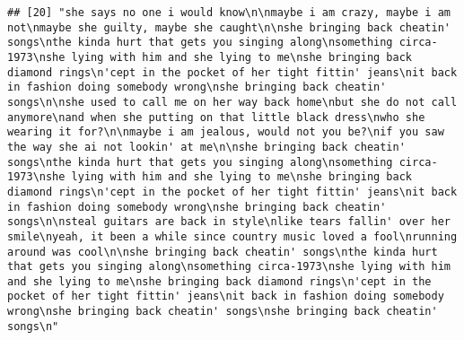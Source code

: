 \documentclass[]{article}
\begin{document}
\begin{verbatim}
## [20] "she says no one i would know\n\nmaybe i am crazy, maybe i am not\nmaybe she guilty, maybe she caught\n\nshe bringing back cheatin' songs\nthe kinda hurt that gets you singing along\nsomething circa-1973\nshe lying with him and she lying to me\nshe bringing back diamond rings\n'cept in the pocket of her tight fittin' jeans\nit back in fashion doing somebody wrong\nshe bringing back cheatin' songs\n\nshe used to call me on her way back home\nbut she do not call anymore\nand when she putting on that little black dress\nwho she wearing it for?\n\nmaybe i am jealous, would not you be?\nif you saw the way she ai not lookin' at me\n\nshe bringing back cheatin' songs\nthe kinda hurt that gets you singing along\nsomething circa-1973\nshe lying with him and she lying to me\nshe bringing back diamond rings\n'cept in the pocket of her tight fittin' jeans\nit back in fashion doing somebody wrong\nshe bringing back cheatin' songs\n\nsteal guitars are back in style\nlike tears fallin' over her smile\nyeah, it been a while since country music loved a fool\nrunning around was cool\n\nshe bringing back cheatin' songs\nthe kinda hurt that gets you singing along\nsomething circa-1973\nshe lying with him and she lying to me\nshe bringing back diamond rings\n'cept in the pocket of her tight fittin' jeans\nit back in fashion doing somebody wrong\nshe bringing back cheatin' songs\nshe bringing back cheatin' songs\n"                                                                                                                                                                                                                                                                                                                                                                                                                                                                                                                                                                                                                                                                                                                                                                                                                                                                                                                                                                                                                                                                                                                                                                                                                                                                                                                                                                                                                                                                                                           

\end{verbatim}
\end{document}
